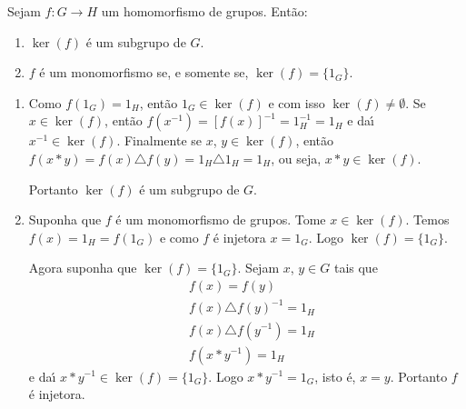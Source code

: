 \begin{proposicao}
	Sejam $f : G \to H$ um homomorfismo de grupos. Ent\~ao:
	\begin{enumerate}[label={\roman*})]
		\item $\ker(f)$ \'e um subgrupo de $G$.
		\item $f$ \'e um monomorfismo se, e somente se, $\ker(f) = \{1_G\}$.
	\end{enumerate}
\end{proposicao}
\begin{prova}
	\begin{enumerate}[label={\roman*})]
		\item Como $f(1_G) = 1_H$, ent\~ao $1_G \in \ker(f)$ e com isso $\ker(f) \ne \emptyset$. Se $x \in \ker(f)$, ent\~ao $f(x^{-1}) = [f(x)]^{-1} = 1_H^{-1} = 1_H$ e da{\'\i} $x^{-1} \in \ker(f)$. Finalmente se $x$, $y \in \ker(f)$, ent\~ao $f(x*y) = f(x)\triangle f(y) = 1_H \triangle 1_H = 1_H$, ou seja, $x * y \in \ker(f)$.

		Portanto $\ker(f)$ \'e um subgrupo de $G$.

		\item Suponha que $f$ \'e um monomorfismo de grupos. Tome $x \in \ker(f)$. Temos $f(x) = 1_H = f(1_G)$ e como $f$ \'e injetora $x = 1_G$. Logo $\ker(f) = \{1_G\}$.

		Agora suponha que $\ker(f) = \{1_G\}$. Sejam $x$, $y \in G$ tais que
		\begin{align*}
			&f(x) = f(y)\\
			&f(x)\triangle f(y)^{-1} = 1_H\\
			&f(x)\triangle f(y^{-1}) = 1_H\\
			&f(x * y^{-1}) = 1_H
		\end{align*}
		e da{\'\i} $x*y^{-1} \in \ker(f) = \{1_G\}$. Logo $x*y^{-1} = 1_G$, isto \'e, $x = y$. Portanto $f$ \'e injetora.
	\end{enumerate}
\end{prova}






